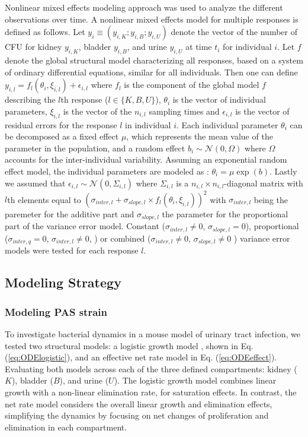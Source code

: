 \documentclass{article}
\begin{document}
Nonlinear mixed effects modeling approach was used to analyze the different observations over time. A nonlinear mixed effects model for multiple responses is defined as follows. Let $y_i \equiv (y_{i,K}; y_{i,B}; y_{i,U})$ denote the vector of the number of CFU for kidney $y_{i,K}$, bladder $y_{i,B}$, and urine $y_{i,U}$ at time $t_i$ for individual $i$.
Let $f$ denote the global structural model characterizing all responses, based on a system of ordinary differential equations, similar for all individuals.
Then one can define $ y_{i,l} = f_{l}(\theta_i, \xi_{i,l} ) + \epsilon_{i,l} $ where $f_{l}$ is the component of the global model $f$ describing the $l$th response ($l \in \{K,B,U\}$), $\theta_i$ is the vector of individual parameters, $\xi_{i,l}$ is the vector of the $n_{i,l}$ sampling times and $\epsilon_{i,l}$ is the vector of residual errors for the  response $l$ in individual $i$. Each individual parameter $\theta_i$ can be decomposed as a fixed effect $\mu$, which represents the mean value of the parameter in the population, and a random effect $b_i \sim \mathcal{N}(0, \Omega)$ where $\Omega$ accounts for the inter-individual variability. Assuming an exponential random effect model, the individual parameters are modeled as : $\theta_i = \mu \exp(b)$.
Lastly we assumed that $\epsilon_{i,l} \sim \mathcal{N} (0, \Sigma_{i,l})$ where $\Sigma_{i,l}$ is a $ n_{i,l} \times n_{i,l}$-diagonal matrix with $l$th elements equal to $(\sigma_{inter,l} + \sigma_{slope,l}\times f_{l}(\theta_i, \xi_{i,l}))^2$ with $\sigma_{inter, l}$ being the paremeter for the additive part and $\sigma_{slope,l}$ the parameter for the proportional part of the variance error model. Constant ($\sigma_{inter, l} \neq 0$, $\sigma_{slope, l} = 0$), proportional ($\sigma_{inter, q} = 0$, $\sigma_{inter, l} \neq 0$, ) or combined ($\sigma_{inter, l} \neq 0$, $\sigma_{slope, l} \neq 0$ ) variance error models were tested for each response $l$.





\subsection{Modeling Strategy}


\subsubsection{Modeling PAS strain}

To investigate bacterial dynamics in a mouse model of urinary tract infection, we tested two structural models: a logistic growth model \cite{allen2018bacterial}, shown in Eq. (\ref{eq:ODElogistic}), and an effective net rate model in Eq. (\ref{eq:ODEeffect}). Evaluating both models across each of the three defined compartments: kidney ($K$), bladder ($B$), and urine ($U$). The logistic growth model combines linear growth with a non-linear elimination rate, for saturation effects. In contrast, the net rate model considers the overall linear growth and elimination effects, simplifying the dynamics by focusing on net changes of proliferation and elimination in each compartment.
\end{document}
